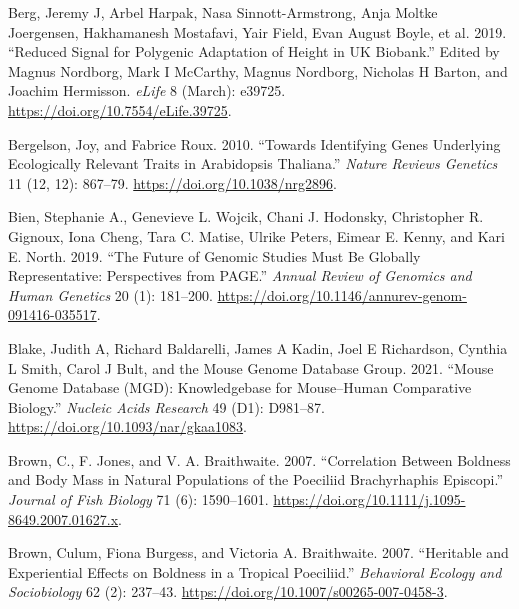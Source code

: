 \documentclass[
]{book}
\newlength{\cslhangindent}
\newlength{\cslentryspacingunit} %
\newenvironment{CSLReferences}[2] %
 {%
  \setlength{\parindent}{0pt}
  \ifodd #1
  \let\oldpar\par
  \def\par{\hangindent=\cslhangindent\oldpar}
  \fi
  \setlength{\parskip}{#2\cslentryspacingunit}
 }%
 {}
\begin{document}
\begin{CSLReferences}{1}{0}
\leavevmode{}%
Berg, Jeremy J, Arbel Harpak, Nasa Sinnott-Armstrong, Anja Moltke Joergensen, Hakhamanesh Mostafavi, Yair Field, Evan August Boyle, et al. 2019. {``Reduced Signal for Polygenic Adaptation of Height in {UK Biobank}.''} Edited by Magnus Nordborg, Mark I McCarthy, Magnus Nordborg, Nicholas H Barton, and Joachim Hermisson. \emph{eLife} 8 (March): e39725. \url{https://doi.org/10.7554/eLife.39725}.

\leavevmode{}%
Bergelson, Joy, and Fabrice Roux. 2010. {``Towards Identifying Genes Underlying Ecologically Relevant Traits in {Arabidopsis} Thaliana.''} \emph{Nature Reviews Genetics} 11 (12, 12): 867--79. \url{https://doi.org/10.1038/nrg2896}.

\leavevmode{}%
Bien, Stephanie A., Genevieve L. Wojcik, Chani J. Hodonsky, Christopher R. Gignoux, Iona Cheng, Tara C. Matise, Ulrike Peters, Eimear E. Kenny, and Kari E. North. 2019. {``The {Future} of {Genomic Studies Must Be Globally Representative}: {Perspectives} from {PAGE}.''} \emph{Annual Review of Genomics and Human Genetics} 20 (1): 181--200. \url{https://doi.org/10.1146/annurev-genom-091416-035517}.

\leavevmode{}%
Blake, Judith A, Richard Baldarelli, James A Kadin, Joel E Richardson, Cynthia L Smith, Carol J Bult, and the Mouse Genome Database Group. 2021. {``Mouse {Genome Database} ({MGD}): {Knowledgebase} for Mouse--Human Comparative Biology.''} \emph{Nucleic Acids Research} 49 (D1): D981--87. \url{https://doi.org/10.1093/nar/gkaa1083}.

\leavevmode{}%
Brown, C., F. Jones, and V. A. Braithwaite. 2007. {``Correlation Between Boldness and Body Mass in Natural Populations of the Poeciliid {Brachyrhaphis} Episcopi.''} \emph{Journal of Fish Biology} 71 (6): 1590--1601. \url{https://doi.org/10.1111/j.1095-8649.2007.01627.x}.

\leavevmode{}%
Brown, Culum, Fiona Burgess, and Victoria A. Braithwaite. 2007. {``Heritable and Experiential Effects on Boldness in a Tropical Poeciliid.''} \emph{Behavioral Ecology and Sociobiology} 62 (2): 237--43. \url{https://doi.org/10.1007/s00265-007-0458-3}.


\end{CSLReferences}
\end{document}
